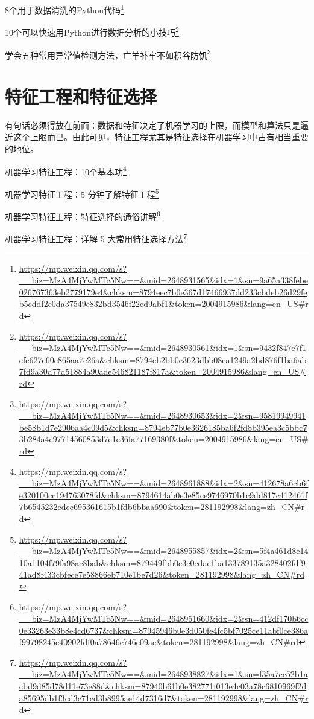 \documentclass[]{ctexbook}
\renewcommand{\href}[2]{#2\footnote{\url{#1}}}
\begin{document}
\href{https://mp.weixin.qq.com/s?__biz=MzA4MjYwMTc5Nw==\&mid=2648931565\&idx=1\&sn=9a65a338febe026767363eb2779179e4\&chksm=8794eec7b0e367d17466937dd233cbdeb26d29feb5cddf2e0da37549e832bd3546f22cd9abf1\&token=2004915986\&lang=en_US\#rd}{8个用于数据清洗的Python代码}

\href{https://mp.weixin.qq.com/s?__biz=MzA4MjYwMTc5Nw==\&mid=2648930561\&idx=1\&sn=9432f847e7f1efe627e60e865aa7c26a\&chksm=8794eb2bb0e3623dbb08ea1249a2bd876f1ba6ab7fd9a30d77d51884a90ade546821187f817a\&token=2004915986\&lang=en_US\#rd}{10个可以快速用Python进行数据分析的小技巧}

\href{https://mp.weixin.qq.com/s?__biz=MzA4MjYwMTc5Nw==\&mid=2648930653\&idx=2\&sn=95819949941be58b1d7e2906aa4c09d5\&chksm=8794eb77b0e3626185ba6f2fd8b395ea3c5bbc73b284a4c97714560853d7e1e36fa77169380f\&token=2004915986\&lang=en_US\#rd}{学会五种常用异常值检测方法，亡羊补牢不如积谷防饥}

\hypertarget{ux7279ux5f81ux5de5ux7a0bux548cux7279ux5f81ux9009ux62e9}{%
\section{特征工程和特征选择}\label{ux7279ux5f81ux5de5ux7a0bux548cux7279ux5f81ux9009ux62e9}}

有句话必须得放在前面：数据和特征决定了机器学习的上限，而模型和算法只是逼近这个上限而已。由此可见，特征工程尤其是特征选择在机器学习中占有相当重要的地位。

\href{https://mp.weixin.qq.com/s?__biz=MzA4MjYwMTc5Nw==\&mid=2648961888\&idx=2\&sn=412678a6cb6fe320100cc194763078fd\&chksm=8794614ab0e3e85ce9746970b1c9dd817c412461f7b6545232edcc695361615b1fdb6bbaa690\&token=281192998\&lang=zh_CN\#rd}{机器学习特征工程：10个基本功}

\href{https://mp.weixin.qq.com/s?__biz=MzA4MjYwMTc5Nw==\&mid=2648955857\&idx=2\&sn=5f4a461d8e1410a1104f79fa98ac8bab\&chksm=879449fbb0e3c0edae1ba133789135a328402fdf941ad8f433cbfece7e58866eb710e1be7d26\&token=281192998\&lang=zh_CN\#rd}{机器学习特征工程：5 分钟了解特征工程}

\href{https://mp.weixin.qq.com/s?__biz=MzA4MjYwMTc5Nw==\&mid=2648951660\&idx=2\&sn=412df170b6cc0e33263e33b8e4cd6737\&chksm=87945946b0e3d050fe4fc5bf7025ce11abf0ce386af99798245c40902fdf0a78646e746e09ac\&token=281192998\&lang=zh_CN\#rd}{机器学习特征工程：特征选择的通俗讲解}

\href{https://mp.weixin.qq.com/s?__biz=MzA4MjYwMTc5Nw==\&mid=2648938827\&idx=1\&sn=f35a7cc52b1acbd9d85d78d11e73e88d\&chksm=87940b61b0e382771f013e4c03a78c6810969f2da85695db1f3cd3c71cd3b8995ae14d7316d7\&token=281192998\&lang=zh_CN\#rd}{机器学习特征工程：详解 5 大常用特征选择方法}
\end{document}
